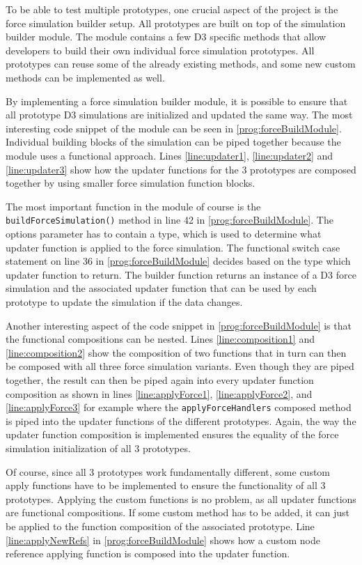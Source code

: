 To be able to test multiple prototypes, one crucial aspect of the project is the force simulation builder setup. All prototypes are built on top of the simulation builder module. The module contains a few D3 specific methods that allow developers to build their own individual force simulation prototypes. All prototypes can reuse some of the already existing methods, and some new custom methods can be implemented as well.

By implementing a force simulation builder module, it is possible to ensure that all prototype D3 simulations are initialized and updated the same way. The most interesting code snippet of the module can be seen in \ref{prog:forceBuildModule}. Individual building blocks of the simulation can be piped together because the module uses a functional approach. Lines \ref{line:updater1}, \ref{line:updater2} and \ref{line:updater3} show how the updater functions for the 3 prototypes are composed together by using smaller force simulation function blocks.

The most important function in the module of course is the \texttt{buildForceSimulation()} method in line 42 in \ref{prog:forceBuildModule}. The options parameter has to contain a type, which is used to determine what updater function is applied to the force simulation. The functional switch case statement on line 36 in \ref{prog:forceBuildModule} decides based on the type which updater function to return. The builder function returns an instance of a D3 force simulation and the associated updater function that can be used by each prototype to update the simulation if the data changes.

Another interesting aspect of the code snippet in \ref{prog:forceBuildModule} is that the functional compositions can be nested. Lines \ref{line:composition1} and \ref{line:composition2} show the composition of two functions that in turn can then be composed with all three force simulation variants. Even though they are piped together, the result can then be piped again into every updater function composition as shown in lines \ref{line:applyForce1}, \ref{line:applyForce2}, and \ref{line:applyForce3} for example where the \texttt{applyForceHandlers} composed method is piped into the updater functions of the different prototypes. Again, the way the updater function composition is implemented ensures the equality of the force simulation initialization of all 3 prototypes.

Of course, since all 3 prototypes work fundamentally different, some custom apply functions have to be implemented to ensure the functionality of all 3 prototypes. Applying the custom functions is no problem, as all updater functions are functional compositions. If some custom method has to be added, it can just be applied to the function composition of the associated prototype. Line \ref{line:applyNewRefs} in \ref{prog:forceBuildModule} shows how a custom node reference applying function is composed into the updater function.

